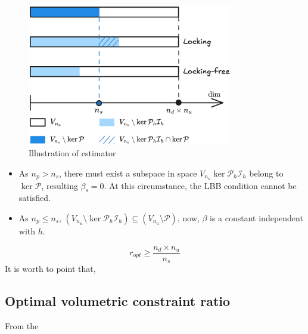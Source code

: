 \begin{figure}[!ht]
    \centering
    \includegraphics[width=0.8\textwidth]{png/space.png}
    \caption{Illustration of estimator}\label{fg:space}
\end{figure}
\begin{itemize}
    \item As $n_p > n_s$, there must exist a subspace in space $V_{n_u}\ker \mathcal P_h \mathcal I_h$ belong to $\ker \mathcal P$, resulting $\beta_s = 0$. At this circumstance, the LBB condition cannot be satisfied.

    \item As $n_p \le n_s$, $(V_{n_u}\setminus \ker \mathcal P_h \mathcal I_h) \subseteq (V_{n_u}\setminus \mathcal P)$, now, $\beta$ is a constant independent with $h$.
\end{itemize}

\begin{equation}
    r_{opt} \ge \frac{n_d\times n_u}{n_s} 
\end{equation}
It is worth to point that,


\subsection{Optimal volumetric constraint ratio}
From the 

